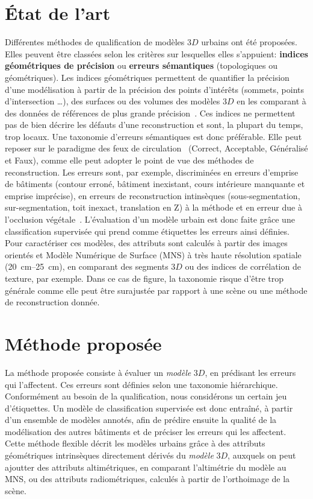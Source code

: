 \documentclass[a4paper,french]{article}
\begin{document}
    \section{\'Etat de l'art}

    Différentes méthodes de qualification de modèles $3D$ urbains ont été proposées. Elles peuvent être classées selon les critères sur lesquelles elles s'appuient: \textbf{indices géométriques de précision} ou \textbf{erreurs sémantiques} (topologiques ou géométriques). Les indices géométriques permettent de quantifier la précision d'une modélisation à partir de la précision des points d'intérêts (sommets, points d'intersection \dots), des surfaces ou des volumes des modèles $3D$ en les comparant à des données de références de plus grande précision~\cite{Zeng2014}. Ces indices ne permettent pas de bien décrire les défauts d'une reconstruction et sont, la plupart du temps, trop locaux. Une taxonomie d'erreurs sémantiques est donc préférable. Elle peut reposer sur le paradigme des feux de circulation~\cite{boudet2006supervised} (Correct, Acceptable, Généralisé et Faux), comme elle peut adopter le point de vue des méthodes de reconstruction. Les erreurs sont, par exemple, discriminées en erreurs d'emprise de bâtiments (contour erroné, bâtiment inexistant, cours intérieure manquante et emprise imprécise), en erreurs de reconstruction intinsèques (sous-segmentation, sur-segmentation, toit inexact, translation en Z) à la méthode et en erreur due à l'occlusion végétale~\cite{Michelin2013}. L'évaluation d'un modèle urbain est donc faite grâce une classification supervisée qui prend comme étiquettes les erreurs ainsi définies. Pour caractériser ces modèles, des attributs sont calculés à partir des images orientés et Modèle Numérique de Surface (MNS) à très haute résolution spatiale (\SIrange{20}{25}{\cm}), en comparant des segments $3D$ ou des indices de corrélation de texture, par exemple. Dans ce cas de figure, la taxonomie risque d'être trop générale comme elle peut être surajustée par rapport à une scène ou une méthode de reconstruction donnée.

    \section{Méthode proposée}

    La méthode proposée consiste à évaluer un \textit{modèle} $3D$, en prédisant les erreurs qui l'affectent. Ces erreurs sont définies selon une taxonomie hiérarchique. Conformément au besoin de la qualification, nous considérons un certain jeu d'étiquettes. Un modèle de classification supervisée est donc entraîné, à partir d'un ensemble de modèles annotés, afin de prédire ensuite la qualité de la modélisation des autres bâtiments et de préciser les erreurs qui les affectent. Cette méthode flexible décrit les modèles urbains grâce à des attributs géométriques intrinsèques directement dérivés du \textit{modèle} $3D$, auxquels on peut ajoutter des attributs altimétriques, en comparant l'altimétrie du modèle au MNS, ou des attributs radiométriques, calculés à partir de l'orthoimage de la scène.
\end{document}
